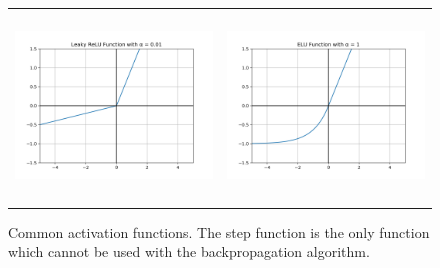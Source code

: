 \begin{figure}[h!]
\begin{center}
{\begin{tabular}{cc}
  \includegraphics[clip, height=5cm]{figures/deeplearning/af_LeakyReLU.png} & 
  \includegraphics[clip, height=5cm]{figures/deeplearning/af_ELU.png} \\
  
  \end{tabular}
  }%
  \end{center}
  \caption[Activation Functions]{Common activation functions. The step function is the only function which cannot be used with the backpropagation algorithm.}
  \label{fig:ActivationFunctions}
\end{figure}

